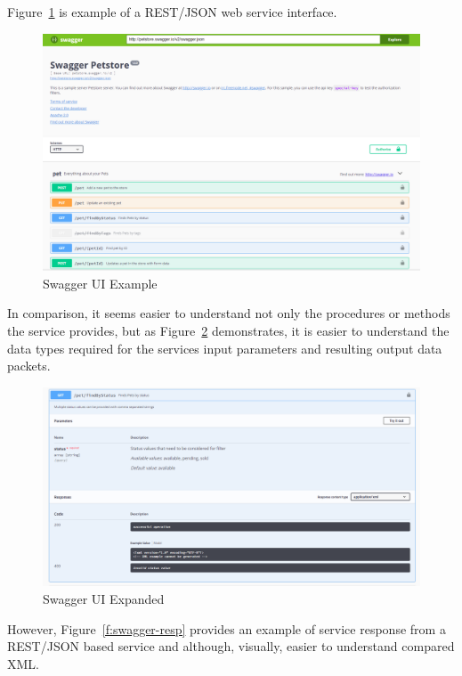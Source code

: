Figure~\ref{f:swaggerui-example}\cite{hid505swaggerio2018} is example of a REST/JSON web service
interface.  
\begin{figure}[!ht]
  \centering\includegraphics[width=\columnwidth]{images/swaggerui.png}
  \caption{Swagger UI Example}\label{f:swaggerui-example}
\end{figure}
In comparison, it seems easier to understand not only the procedures
or methods the service provides, but as Figure~\ref{f:swaggerui-expansion}\cite{hid505swaggerio2018}
demonstrates, it is easier to understand the data types required for the services input
parameters and resulting output data packets.  
\begin{figure}[!ht]
  \centering\includegraphics[width=\columnwidth]{images/swaggerui-expansion.png}
  \caption{Swagger UI Expanded}\label{f:swaggerui-expansion}
\end{figure}
However, Figure~\ref{f:swagger-resp}\cite{hid505swaggerresp2018} provides an example 
of service response from a REST/JSON based service and although, visually, 
easier to understand compared XML.  
